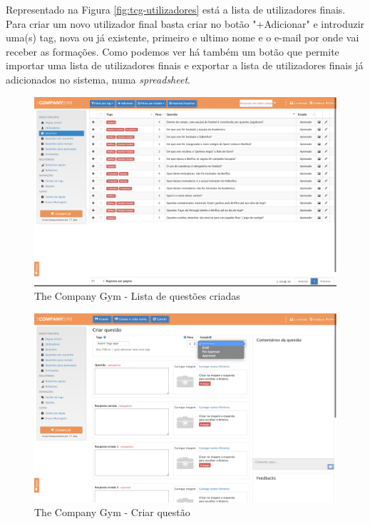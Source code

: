 Representado na Figura \ref{fig:tcg-utilizadores} está a lista de utilizadores finais. Para criar um novo utilizador final basta criar no botão "+Adicionar" e introduzir uma(s) tag, nova ou já existente, primeiro e ultimo nome e o e-mail por onde vai receber as formações. Como podemos ver há também um botão que permite importar uma lista de utilizadores finais e exportar a lista de utilizadores finais já adicionados no sistema, numa \textit{spreadsheet}.
\newpage

\begin{figure}[ht!]
	\begin{center}
		\includegraphics[width=1\textwidth]{img/tcg/tcg-questoes.png}
		\caption{The Company Gym - Lista de questões criadas}
		\label{fig:tcg-questoes}
	\end{center}
\end{figure}

\begin{figure}[ht!]
	\begin{center}
		\includegraphics[width=1\textwidth]{img/tcg/tcg-criar-questao.png}
		\caption{The Company Gym - Criar questão}
		\label{fig:tcg-criar-questoes}
	\end{center}
\end{figure}

